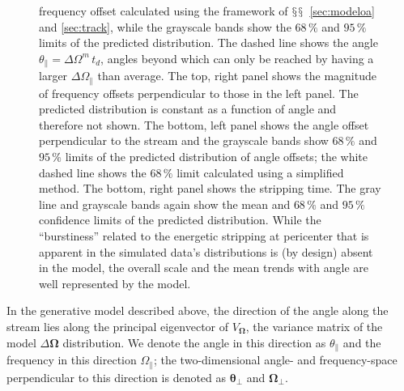 \documentclass[12pt,preprint]{aastex}
\newcommand{\sectionname}{$\mathsection$}
\renewcommand{\vec}[1]{\ensuremath{\mathbf{#1}}}
\newcommand{\veco}{\ensuremath{\vec{\Omega}}}
\newcommand{\veca}{\ensuremath{\boldsymbol\theta}}
\newcommand{\apar}{\ensuremath{\theta_\parallel}}
\newcommand{\opar}{\ensuremath{\Omega_\parallel}}
\newcommand{\aperp}{\ensuremath{\veca_\perp}}
\newcommand{\operp}{\ensuremath{\veco_\perp}}
\begin{document}
\begin{figure}[t!]
{    frequency offset calculated using the framework of
    \sectionname\sectionname~\ref{sec:modeloa} and \ref{sec:track},
    while the grayscale bands show the $68\,\%$ and $95\,\%$ limits of
    the predicted distribution. The dashed line shows the angle $\apar
    = \Delta \Omega^m\,t_d$, angles beyond which can only be reached
    by having a larger $\Delta \opar$ than average. The top, right
    panel shows the magnitude of frequency offsets perpendicular to
    those in the left panel. The predicted distribution is constant as
    a function of angle and therefore not shown. The bottom, left
    panel shows the angle offset perpendicular to the stream and the
    grayscale bands show $68\,\%$ and $95\,\%$ limits of the predicted
    distribution of angle offsets; the white dashed line shows the
    $68\,\%$ limit calculated using a simplified method. The bottom,
    right panel shows the stripping time. The gray line and grayscale
    bands again show the mean and $68\,\%$ and $95\,\%$ confidence
    limits of the predicted distribution. While the ``burstiness''
    related to the energetic stripping at pericenter that is apparent
    in the simulated data's distributions is (by design) absent in the
    model, the overall scale and the mean trends with angle are well
    represented by the model.}\label{fig:gd1_apar}
\end{figure}

In the generative model described above, the direction of the angle
along the stream lies along the principal eigenvector of $V_\veco$,
the variance matrix of the model $\Delta \veco$ distribution. We
denote the angle in this direction as $\apar$ and the frequency in
this direction $\opar$; the two-dimensional angle- and frequency-space
perpendicular to this direction is denoted as $\aperp$ and $\operp$.
\end{document}
